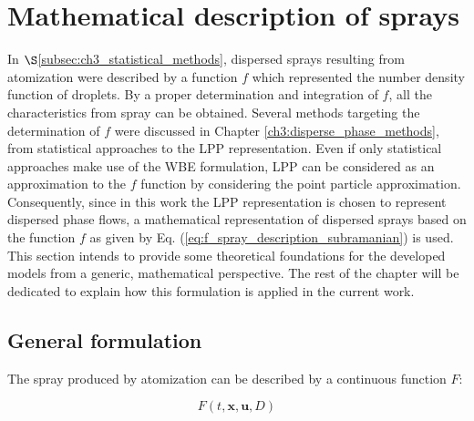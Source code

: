 


\section{Mathematical description of sprays}
	\label{sec:ch4_spray_description}

In $\S$\ref{subsec:ch3_statistical_methods}, dispersed sprays resulting from atomization were described by a function $f$ which represented the number density function of droplets. By a proper determination and integration of $f$, all the characteristics from spray can be obtained. Several methods targeting the determination of $f$ were discussed in Chapter \ref{ch3:disperse_phase_methods}, from statistical approaches to the LPP representation. Even if only statistical approaches make use of the WBE formulation, LPP can be considered as an approximation to the $f$ function by considering the point particle approximation. Consequently, since in this work the LPP representation is chosen to represent dispersed phase flows, a mathematical representation of dispersed sprays based on the function $f$ as given by Eq. (\ref{eq:f_spray_description_subramanian}) is used. This section intends to provide some theoretical foundations for the developed models from a generic, mathematical perspective. The rest of the chapter will be dedicated to explain how this formulation is applied in the current work. \\

\subsection{General formulation}

The spray produced by atomization can be described by a continuous function $F$:

\begin{equation}
F \left( t, \textbf{x}, \textbf{u}, D \right) 
\end{equation}

